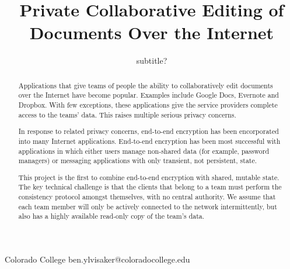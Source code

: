 \documentclass[pldi,10pt,preprint]{sigplanconf-pldi16}
\begin{document}
\newcommand{\LoginSalt}[1]{{$\textrm{LoginSalt}_{#1}$}}
\newcommand{\subscr}[2]{{$\textrm{#1}_{#2}$}}

\setlength{\pdfpageheight}{\paperheight}
\setlength{\pdfpagewidth}{\paperwidth}



\title{Private Collaborative Editing of Documents Over the Internet}
\subtitle{subtitle?}

           {Colorado College}
           {ben.ylvisaker@coloradocollege.edu}

\maketitle

\begin{abstract}

Applications that give teams of people the ability to collaboratively edit documents over the Internet have become popular.
Examples include Google Docs, Evernote and Dropbox.
With few exceptions, these applications give the service providers complete access to the teams' data.
This raises multiple serious privacy concerns.

In response to related privacy concerns, end-to-end encryption has been encorporated into many Internet applications.
End-to-end encryption has been most successful with applications in which either users manage non-shared data (for example, password managers) or messaging applications with only transient, not persistent, state.

This project is the first to combine end-to-end encryption with shared, mutable state.
The key technical challenge is that the clients that belong to a team must perform the consistency protocol amongst themselves, with no central authority.
We assume that each team member will only be actively connected to the network intermittently, but also has a highly available read-only copy of the team's data.

\end{abstract}
\end{document}
